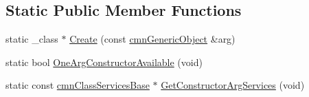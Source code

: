 \subsection*{Static Public Member Functions}
\begin{DoxyCompactItemize}
\item 
static \-\_\-class $\ast$ \hyperlink{classcmn_conditional_object_factory_one_arg_3_01_c_m_n___d_y_n_a_m_i_c___c_r_e_a_t_i_o_n___o_n_e238fc68bde68abb82aef992b13cfbb36_afbed14fbd3c0531521075b6f34c07f9a}{Create} (const \hyperlink{classcmn_generic_object}{cmn\-Generic\-Object} \&arg)
\item 
static bool \hyperlink{classcmn_conditional_object_factory_one_arg_3_01_c_m_n___d_y_n_a_m_i_c___c_r_e_a_t_i_o_n___o_n_e238fc68bde68abb82aef992b13cfbb36_af43c674423c524d16e0f1f185ade1937}{One\-Arg\-Constructor\-Available} (void)
\item 
static const \hyperlink{classcmn_class_services_base}{cmn\-Class\-Services\-Base} $\ast$ \hyperlink{classcmn_conditional_object_factory_one_arg_3_01_c_m_n___d_y_n_a_m_i_c___c_r_e_a_t_i_o_n___o_n_e238fc68bde68abb82aef992b13cfbb36_acf4e23deede28067d97ce27ffa8466b3}{Get\-Constructor\-Arg\-Services} (void)
\end{DoxyCompactItemize}



